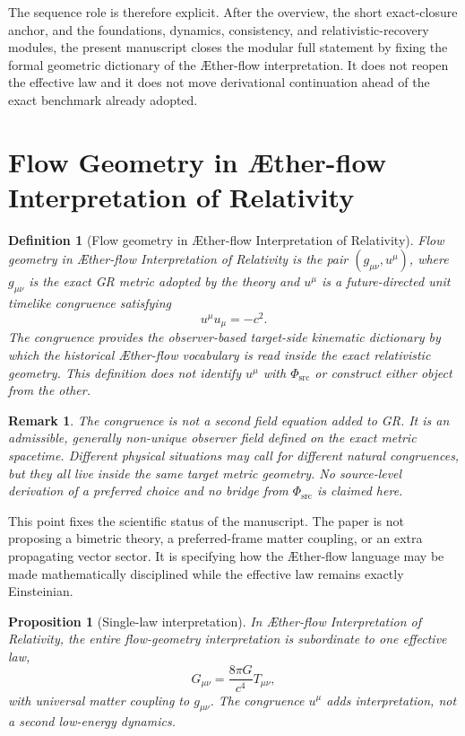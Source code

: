 \documentclass[11pt]{article}
\newcommand{\Aflow}{\AE{}ther-flow}
\newcommand{\TheoryName}{\Aflow{} Interpretation of Relativity}
\newcommand{\PhiSrc}{\Phi_{\mathrm{src}}}
\newtheorem{definition}{Definition}
\newtheorem{proposition}{Proposition}
\newtheorem{remark}{Remark}
\begin{document}
The sequence role is therefore explicit. After the overview, the short exact-closure anchor, and the foundations, dynamics, consistency, and relativistic-recovery modules, the present manuscript closes the modular full statement by fixing the formal geometric dictionary of the \Aflow{} interpretation. It does not reopen the effective law and it does not move derivational continuation ahead of the exact benchmark already adopted.

\section{Flow Geometry in \TheoryName{}}

\begin{definition}[Flow geometry in \TheoryName{}]
Flow geometry in \TheoryName{} is the pair \((g_{\mu\nu},u^\mu)\), where \(g_{\mu\nu}\) is the exact GR metric adopted by the theory and \(u^\mu\) is a future-directed unit timelike congruence satisfying
\begin{equation}
u^\mu u_\mu = -c^2.
\label{eq:unitnorm}
\end{equation}
The congruence provides the observer-based target-side kinematic dictionary by
which the historical \Aflow{} vocabulary is read inside the exact relativistic
geometry. This definition does not identify \(u^\mu\) with \(\PhiSrc\) or
construct either object from the other.
\end{definition}

\begin{remark}
The congruence is not a second field equation added to GR. It is an admissible,
generally non-unique observer field defined on the exact metric spacetime.
Different physical situations may call for different natural congruences, but
they all live inside the same target metric geometry. No source-level
derivation of a preferred choice and no bridge from \(\PhiSrc\) is claimed
here.
\end{remark}

This point fixes the scientific status of the manuscript. The paper is not proposing a bimetric theory, a preferred-frame matter coupling, or an extra propagating vector sector. It is specifying how the \Aflow{} language may be made mathematically disciplined while the effective law remains exactly Einsteinian.

\begin{proposition}[Single-law interpretation]
In \TheoryName{}, the entire flow-geometry interpretation is subordinate to one effective law,
\begin{equation}
G_{\mu\nu}=\frac{8\pi G}{c^4}T_{\mu\nu},
\label{eq:einstein}
\end{equation}
with universal matter coupling to \(g_{\mu\nu}\). The congruence \(u^\mu\) adds interpretation, not a second low-energy dynamics.
\end{proposition}
\end{document}
